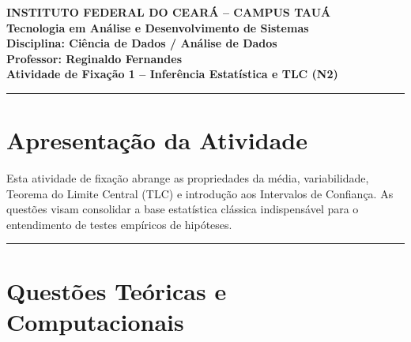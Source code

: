 \documentclass[12pt]{article}
\begin{document}
\begin{center}
    \vspace{0.5cm}
    \textbf{INSTITUTO FEDERAL DO CEARÁ -- CAMPUS TAUÁ} \\
    \textbf{Tecnologia em Análise e Desenvolvimento de Sistemas} \\
    \textbf{Disciplina: Ciência de Dados / Análise de Dados} \\
    \textbf{Professor: Reginaldo Fernandes} \\
    \vspace{0.5cm}
    \large{\textbf{Atividade de Fixação 1 -- Inferência Estatística e TLC (N2)}}
    \vspace{0.3cm}
\end{center}

\hrule
\vspace{0.4cm}

\section*{Apresentação da Atividade}
Esta atividade de fixação abrange as propriedades da média, variabilidade, Teorema do Limite Central (TLC) e introdução aos Intervalos de Confiança. As questões visam consolidar a base estatística clássica indispensável para o entendimento de testes empíricos de hipóteses.

\vspace{0.3cm}
\hrule
\vspace{0.5cm}

\section*{Questões Teóricas e Computacionais}
\end{document}
